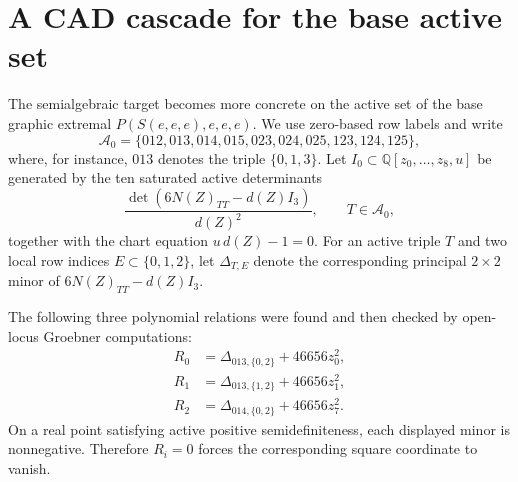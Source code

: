 \documentclass[11pt]{article}
\numberwithin{equation}{section}
\theoremstyle{definition}
\newcommand{\cA}{\mathcal A}
\begin{document}
\section{A CAD cascade for the base active set}\label{sec:cad-cascade}

The semialgebraic target becomes more concrete on the active set of the base
graphic extremal $P(S(e,e,e),e,e,e)$.  We use zero-based row labels and write
\[
  \cA_0=\{012,013,014,015,023,024,025,123,124,125\},
\]
where, for instance, $013$ denotes the triple $\{0,1,3\}$.  Let
$I_0\subset\mathbb Q[z_0,\ldots,z_8,u]$ be generated by the ten saturated active
determinants
\[
  \frac{\det(6N(Z)_{TT}-d(Z)I_3)}{d(Z)^2},\qquad T\in\cA_0,
\]
together with the chart equation $u\,d(Z)-1=0$.  For an active triple $T$ and
two local row indices $E\subset\{0,1,2\}$, let $\Delta_{T,E}$ denote the
corresponding principal $2\times2$ minor of $6N(Z)_{TT}-d(Z)I_3$.

The following three polynomial relations were found and then checked by
open-locus Groebner computations:
\begin{align*}
  R_0&=\Delta_{013,\{0,2\}}+46656z_0^2,\\
  R_1&=\Delta_{013,\{1,2\}}+46656z_1^2,\\
  R_2&=\Delta_{014,\{0,2\}}+46656z_7^2.
\end{align*}
On a real point satisfying active positive semidefiniteness, each displayed
minor is nonnegative.  Therefore $R_i=0$ forces the corresponding square
coordinate to vanish.
\end{document}
